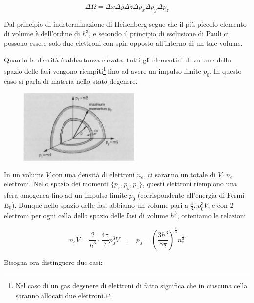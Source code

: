 $$\Delta \Omega=\Delta x \Delta y \Delta z \Delta p_x \Delta p_y \Delta p_z$$

Dal principio di indeterminazione di Heisenberg segue che il più piccolo elemento di volume è dell'ordine di $h^3$, e secondo il principio di esclusione di Pauli ci possono essere solo due elettroni con spin opposto all'interno di un tale volume.

Quando la densità è abbastanza elevata, tutti gli elementini di volume dello spazio delle fasi vengono riempiti\footnote{Nel caso di un gas degenere di elettroni di fatto significa che in ciascuna cella saranno allocati due elettroni.} fino ad avere un impulso limite $p_0$. In questo caso si parla di materia nello stato degenere.

\begin{minipage}{0.395\textwidth}
    \begin{figure}[H]
        \centering
        \includegraphics[width=6cm]{immagini/spazio_dei_momenti_gas_degenere.png}
    \end{figure}
\end{minipage}
\begin{minipage}{0.6\textwidth}
    \vspace{0.6cm}In un volume $V$ con una densità di elettroni $n_e$, ci saranno un totale di $V \cdot n_e$ elettroni. Nello spazio dei momenti $\{p_x,p_y,p_z\}$, questi elettroni riempiono una sfera omogenea fino ad un impulso limite $p_0$ (corrispondente all'energia di Fermi $E_0$). Dunque nello spazio delle fasi abbiamo un volume pari a $\frac{4}{3}\pi p_0^3 V$, e con 2 elettroni per ogni cella dello spazio delle fasi di volume $h^3$, otteniamo le relazioni
\end{minipage}

\vspace{0.2cm}

$$n_e V=\frac{2}{h^3} \cdot \frac{4 \pi}{3} p_0^3 V
\quad,\quad
p_0=\left( \frac{3h^3}{8 \pi} \right)^{\frac{1}{3}} n_e^{\frac{1}{3}}$$

Bisogna ora distinguere due casi:

